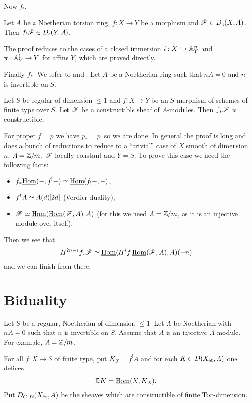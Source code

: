 \documentclass[oneside]{amsart}
\begin{document}
Now $f_!$.
\begin{theorem}[Fu 7.8.1]
	Let $A$ be a Noetherian torsion ring, $f:X\to Y$ be a morphism and $\mathscr{F}\in D_c(X,A)$.
	Then $f_!\mathscr{F}\in D_c(Y,A)$.
\end{theorem}
The proof reduces to the cases of a closed immersion $i:X\hookrightarrow \mathbb A_Y^{n}$ and
$\pi:\Aff_Y^{1}\to Y$ for affine $Y$, which are proved directly.

Finally $f_*$. We refer to \cite[Chapitre 7]{SGA4.5} and \cite[Chapter 9.5]{Fu}. Let $A$
be a Noetherian ring such that $nA=0$ and $n$ is invertible on $S$.
\begin{theorem}
	Let $S$ be regular of dimension $\le 1$ and $f:X\to Y$ be an $S$-morphism of
	schemes of finite type over $S$. Let $\mathscr{F}$ be a constructible sheaf of $A$-modules. Then
	$f_*\mathscr{F}$ is constructible.
\end{theorem}
For proper $f=p$ we have $p_*=p_!$ so we are done. In general the proof is long and does
a bunch of reductions to reduce to a ``trivial'' case of $X$ smooth of dimension $n$,
$A=\mathbb Z /m$, $\mathscr{F}$ locally constant and $Y=S$. To prove this case we need the following facts:
\begin{itemize}
	\item $f_*\underline{\operatorname{Hom}}(-,f^{!}-) \simeq \underline{\operatorname{Hom}}(f_!-,-)$,
	\item $f^{!}A\simeq A(d)[2d]$ (Verdier duality),
	\item $\mathscr{F}\simeq \underline{\operatorname{Hom}}(\underline{\operatorname{Hom}}(\mathscr{F},A),A)$ (for this we need $A=\mathbb Z/m$, as it is an
		injective module over itself).
\end{itemize}
Then we see that
\[
	H^{2n-i}f_*\mathscr{F} \simeq \underline{\operatorname{Hom}}(H^{i}f_!\underline{\operatorname{Hom}}(\mathscr{F},A),A)(-n)
\]
and we can finish from there.

\section{Biduality}
Let $S$ be a regular, Noetherian of dimension $\le 1$. Let $A$ be Noetherian with $nA=0$
such that $n$ is invertible on $S$. Assume that $A$ is an injective $A$-module. For
example, $A=\mathbb Z /m$.

For all $f:X\to S$ of finite type, put $K_X=f^{!}A$ and for each $K\in D(X_{\mathrm{\acute{e}t}},A)$ one defines
\[
	\mathbb{D} K = \underline{\operatorname{Hom}}(K,K_X).
\]
Put $D_{C,ft}(X_{\mathrm{\acute{e}t}},A)$ be the sheaves which are constructible of finite $\operatorname{Tor}$-dimension.
\end{document}
